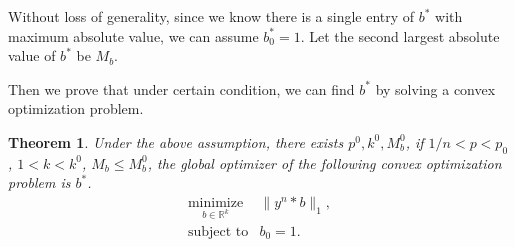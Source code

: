 \documentclass[letter, 10pt]{article}
\newtheorem{theorem}{Theorem}[section]
\numberwithin{equation}{section}
\begin{document}
Without loss of generality, since we know there is a single entry of $b^*$ with maximum absolute value, we can assume $b^*_0 =1$. Let the second largest absolute value of $b^*$ be $M_b$.

Then we prove that under certain condition, we can find $b^*$ by solving a convex optimization problem.
 
\begin{theorem}
Under the above assumption, there exists $p^0, k^0, M_b^0$, if $1/n <p< p_0$, $1<k< k^0$, $M_b\leq M_b^0$,
the global optimizer of the following convex optimization problem is $b^*$.
 \begin{eqnarray*}
\underset{b\in\mathbb{R}^k}{\mbox{minimize}}& \|y^n*b\|_1 ,\\
\mbox{subject to}& b_0 =1.
 \end{eqnarray*}
\end{theorem}
\end{document}
